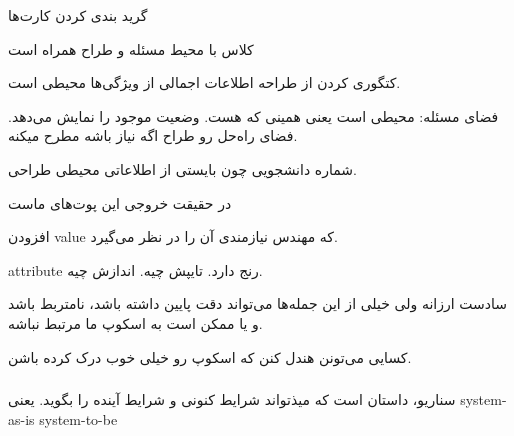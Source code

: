 




گرید بندی کردن کارت‌ها


کلاس با محیط مسئله و طراح همراه است

کتگوری کردن از طراحه
اطلاعات اجمالی از ویژگی‌ها محیطی است.

فضای مسئله: محیطی است یعنی همینی که هست. وضعیت موجود را نمایش می‌دهد.
فضای راه‌حل رو طراح اگه نیاز باشه مطرح میکنه.

شماره دانشجویی چون بایستی از اطلاعاتی محیطی طراحی.

در حقیقت خروجی این پوت‌های ماست

افزودن value که مهندس نیازمندی آن را در نظر می‌گیرد.

attribute رنج دارد. تایپش چیه. اندازش چیه.

سادست ارزانه
ولی خیلی از این جمله‌ها می‌تواند دقت پایین داشته باشد، نامتربط باشد و یا ممکن
است به اسکوپ ما مرتبط نباشه.

کسایی می‌تونن هندل کنن که اسکوپ رو خیلی خوب درک کرده باشن.


\subsubsection{}

سناریو، داستان است که میذتواند شرایط کنونی و شرایط آینده را بگوید. 
یعنی system-as-is
system-to-be

